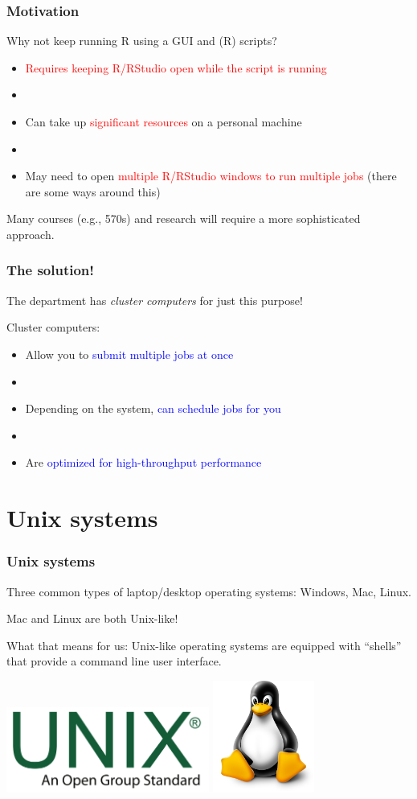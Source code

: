 \documentclass[12pt, 
hyperref={colorlinks=true, linkcolor=blue, urlcolor=cyan}]{beamer}
\newcommand{\myframe}[1]{\begin{frame} \frametitle{#1}}
\begin{document}
\myframe{Motivation}
Why not keep running R using a GUI and (R) scripts?
\begin{itemize}
\item \textcolor{red}{Requires keeping R/RStudio open while the script is running}
\item[]
\item Can take up \textcolor{red}{significant resources} on a personal machine
\item[]
\item May need to open \textcolor{red}{multiple R/RStudio windows to run multiple jobs} (there are some ways around this)
\end{itemize}

Many courses (e.g., 570s) and research will require a more sophisticated approach.
\end{frame}

\myframe{The solution!}
The department has \emph{cluster computers} for just this purpose!

Cluster computers:
\begin{itemize}
\item Allow you to \textcolor{blue}{submit multiple jobs at once}
\item[]
\item Depending on the system, \textcolor{blue}{can schedule jobs for you}
\item[]
\item Are \textcolor{blue}{optimized for high-throughput performance}
\end{itemize}
\end{frame}

\section{Unix systems}
\myframe{Unix systems}
Three common types of laptop/desktop operating systems: Windows, Mac, Linux.

Mac and Linux are both Unix-like!

What that means for us: Unix-like operating systems are equipped with ``shells'' that provide a command line user interface.

\centering
\includegraphics[width=0.5\textwidth]{unix.png}
\hspace{2cm}
\includegraphics[width=0.25\textwidth]{linux.png}
\end{frame}
\end{document}
